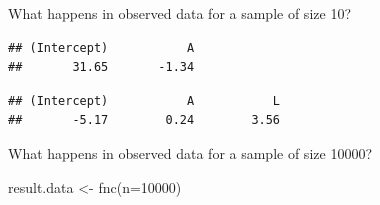 \documentclass[
]{book}
\newenvironment{Shaded}{\begin{snugshade}}{\end{snugshade}}
\newcommand{\AttributeTok}[1]{\textcolor[rgb]{0.77,0.63,0.00}{#1}}
\newcommand{\DecValTok}[1]{\textcolor[rgb]{0.00,0.00,0.81}{#1}}
\newcommand{\FunctionTok}[1]{\textcolor[rgb]{0.00,0.00,0.00}{#1}}
\newcommand{\NormalTok}[1]{#1}
\newcommand{\OtherTok}[1]{\textcolor[rgb]{0.56,0.35,0.01}{#1}}
\newcommand{\SpecialCharTok}[1]{\textcolor[rgb]{0.00,0.00,0.00}{#1}}
\newcommand{\StringTok}[1]{\textcolor[rgb]{0.31,0.60,0.02}{#1}}
\begin{document}
What happens in observed data for a sample of size 10?

\begin{Shaded}
\end{Shaded}

\begin{verbatim}
## (Intercept)           A 
##       31.65       -1.34
\end{verbatim}

\begin{Shaded}
\end{Shaded}

\begin{verbatim}
## (Intercept)           A           L 
##       -5.17        0.24        3.56
\end{verbatim}

What happens in observed data for a sample of size 10000?

\begin{Shaded}
\begin{Highlighting}[]
\NormalTok{result.data }\OtherTok{\textless{}{-}} \FunctionTok{fnc}\NormalTok{(}\AttributeTok{n=}\DecValTok{10000}\NormalTok{)}
\end{Highlighting}
\end{Shaded}

\begin{Shaded}
\end{Shaded}
\end{document}
